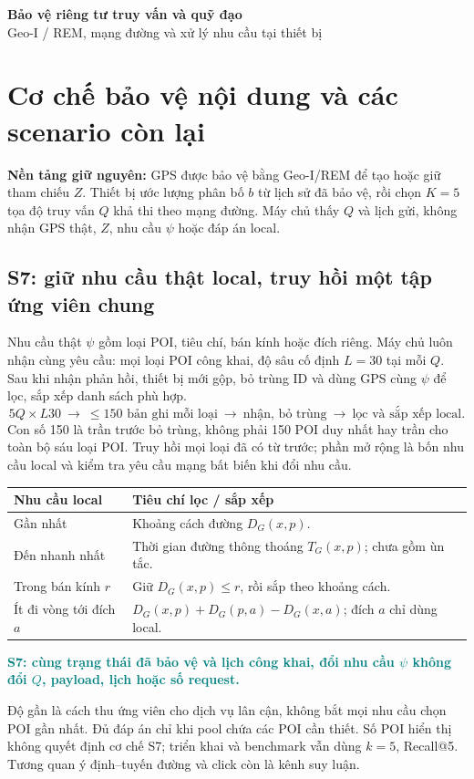\documentclass[10pt,a4paper]{article}
\newcommand{\key}[1]{\par\smallskip\noindent\textcolor{teal}{\textbf{#1}}\par\smallskip}
\begin{document}
\begin{center}
{\LARGE\bfseries\color{ink}Bảo vệ riêng tư truy vấn và quỹ đạo}\\[3pt]
{\large Geo-I / REM, mạng đường và xử lý nhu cầu tại thiết bị}
\end{center}

\section{Cơ chế bảo vệ nội dung và các scenario còn lại}
\textbf{Nền tảng giữ nguyên:} GPS được bảo vệ bằng Geo-I/REM để tạo hoặc giữ tham chiếu $Z$.
Thiết bị ước lượng phân bố $b$ từ lịch sử đã bảo vệ, rồi chọn $K=5$ tọa độ truy vấn $Q$ khả thi theo mạng đường.
Máy chủ thấy $Q$ và lịch gửi, không nhận GPS thật, $Z$, nhu cầu $\psi$ hoặc đáp án local.

\subsection{S7: giữ nhu cầu thật local, truy hồi một tập ứng viên chung}
Nhu cầu thật $\psi$ gồm loại POI, tiêu chí, bán kính hoặc đích riêng. Máy chủ luôn nhận cùng yêu cầu:
mọi loại POI công khai, độ sâu cố định $L=30$ tại mỗi $Q$. Sau khi nhận phản hồi, thiết bị mới gộp,
bỏ trùng ID và dùng GPS cùng $\psi$ để lọc, sắp xếp danh sách phù hợp.
\[
5Q\times L30\ \longrightarrow\ \leq150\text{ bản ghi mỗi loại}
\ \longrightarrow\ \text{nhận, bỏ trùng}\ \longrightarrow\ \text{lọc và sắp xếp local}.
\]
Con số 150 là trần trước bỏ trùng, không phải 150 POI duy nhất hay trần cho toàn bộ sáu loại POI.
Truy hồi mọi loại đã có từ trước; phần mở rộng là bốn nhu cầu local và kiểm tra yêu cầu mạng bất biến khi đổi nhu cầu.

\par\smallskip
\begin{tabularx}{\linewidth}{@{}P{3.4cm}Y@{}}\toprule
\textbf{Nhu cầu local} & \textbf{Tiêu chí lọc / sắp xếp}\\\midrule
Gần nhất & Khoảng cách đường $D_G(x,p)$.\\
Đến nhanh nhất & Thời gian đường thông thoáng $T_G(x,p)$; chưa gồm ùn tắc.\\
Trong bán kính $r$ & Giữ $D_G(x,p)\leq r$, rồi sắp theo khoảng cách.\\
Ít đi vòng tới đích $a$ & $D_G(x,p)+D_G(p,a)-D_G(x,a)$; đích $a$ chỉ dùng local.\\\bottomrule
\end{tabularx}

\key{S7: cùng trạng thái đã bảo vệ và lịch công khai, đổi nhu cầu $\psi$ không đổi $Q$, payload, lịch hoặc số request.}
Độ gần là cách thu ứng viên cho dịch vụ lân cận, không bắt mọi nhu cầu chọn POI gần nhất.
Đủ đáp án chỉ khi pool chứa các POI cần thiết. Số POI hiển thị không quyết định cơ chế S7;
triển khai và benchmark vẫn dùng $k=5$, Recall@5. Tương quan ý định--tuyến đường và click còn là kênh suy luận.
\end{document}
